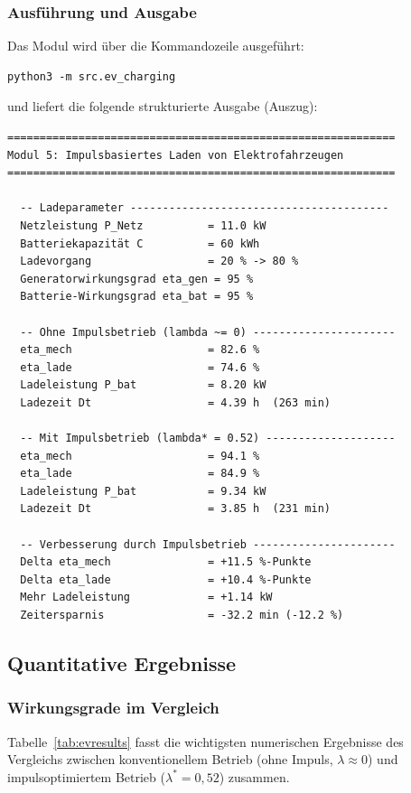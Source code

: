 ﻿\documentclass[a4paper,12pt]{article}
\begin{document}
\subsubsection{Ausführung und Ausgabe}

Das Modul wird über die Kommandozeile ausgeführt:
\begin{verbatim}
python3 -m src.ev_charging
\end{verbatim}
und liefert die folgende strukturierte Ausgabe (Auszug):
\begin{verbatim}
============================================================
Modul 5: Impulsbasiertes Laden von Elektrofahrzeugen
============================================================

  -- Ladeparameter ----------------------------------------
  Netzleistung P_Netz          = 11.0 kW
  Batteriekapazität C          = 60 kWh
  Ladevorgang                  = 20 % -> 80 %
  Generatorwirkungsgrad eta_gen = 95 %
  Batterie-Wirkungsgrad eta_bat = 95 %

  -- Ohne Impulsbetrieb (lambda ~= 0) ----------------------
  eta_mech                     = 82.6 %
  eta_lade                     = 74.6 %
  Ladeleistung P_bat           = 8.20 kW
  Ladezeit Dt                  = 4.39 h  (263 min)

  -- Mit Impulsbetrieb (lambda* = 0.52) --------------------
  eta_mech                     = 94.1 %
  eta_lade                     = 84.9 %
  Ladeleistung P_bat           = 9.34 kW
  Ladezeit Dt                  = 3.85 h  (231 min)

  -- Verbesserung durch Impulsbetrieb ----------------------
  Delta eta_mech               = +11.5 %-Punkte
  Delta eta_lade               = +10.4 %-Punkte
  Mehr Ladeleistung            = +1.14 kW
  Zeitersparnis                = -32.2 min (-12.2 %)
\end{verbatim}

\subsection{Quantitative Ergebnisse}

\subsubsection{Wirkungsgrade im Vergleich}

Tabelle~\ref{tab:evresults} fasst die wichtigsten numerischen Ergebnisse
des Vergleichs zwischen konventionellem Betrieb (ohne Impuls, $\lambda \approx 0$)
und impulsoptimiertem Betrieb ($\lambda^* = 0{,}52$) zusammen.
\end{document}
